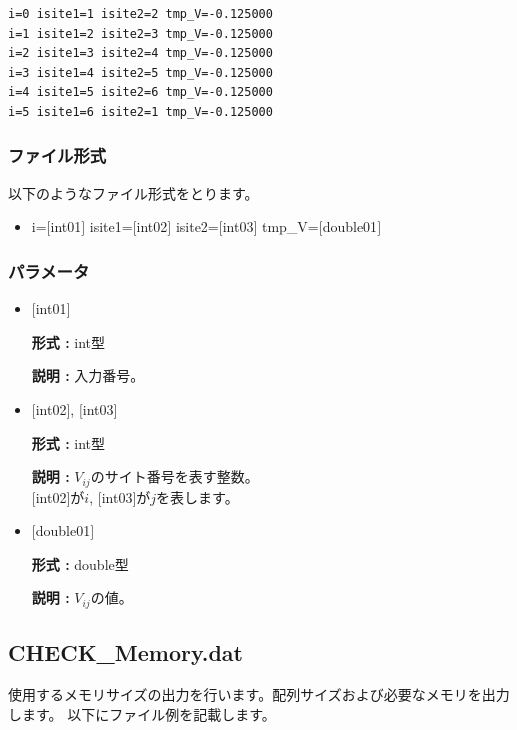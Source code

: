 \begin{minipage}{12.5cm}
\begin{screen}
\begin{verbatim}
i=0 isite1=1 isite2=2 tmp_V=-0.125000 
i=1 isite1=2 isite2=3 tmp_V=-0.125000 
i=2 isite1=3 isite2=4 tmp_V=-0.125000 
i=3 isite1=4 isite2=5 tmp_V=-0.125000 
i=4 isite1=5 isite2=6 tmp_V=-0.125000 
i=5 isite1=6 isite2=1 tmp_V=-0.125000 
\end{verbatim}
\end{screen}
\end{minipage}

\subsubsection{ファイル形式}
以下のようなファイル形式をとります。
 \begin{itemize}
   \item  i=$[$int01$]$ isite1=$[$int02$]$ isite2=$[$int03$]$ tmp\_V=$[$double01$]$ 
 \end{itemize}
 
\subsubsection{パラメータ}
 \begin{itemize}

    \item  $[$int01$]$ 
   
    {\bf 形式 :} int型

   {\bf 説明 :} 入力番号。
      
   \item  $[$int02$]$, $[$int03$]$
   
    {\bf 形式 :} int型

    {\bf 説明 :}  $V_{ij}$のサイト番号を表す整数。 \\
    $[$int02$]$が$i$, $[$int03$]$が$j$を表します。
 
   \item  $[$double01$]$ 
   
    {\bf 形式 :} double型

   {\bf 説明 :} $V_{ij}$の値。
\end{itemize}


\newpage
\subsection{CHECK\_Memory.dat}
使用するメモリサイズの出力を行います。配列サイズおよび必要なメモリを出力します。
以下にファイル例を記載します。

